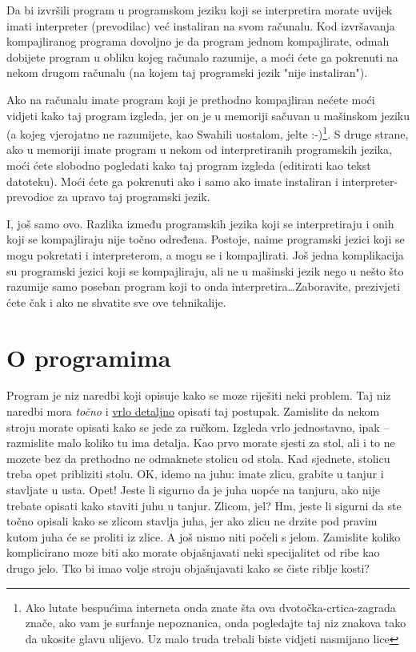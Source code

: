 	Da bi izvršili program u programskom jeziku koji se interpretira morate uvijek
	imati interpreter (prevodilac) već instaliran na svom računalu. Kod
	izvršavanja kompajliranog programa dovoljno je da program jednom kompajlirate,
	odmah dobijete program u obliku kojeg računalo razumije, a moći ćete ga
	pokrenuti na nekom drugom računalu (na kojem taj programski jezik "nije
	instaliran"). 

	Ako na računalu imate program koji je prethodno kompajliran nećete moći
	vidjeti kako taj program izgleda, jer on je u memoriji sačuvan u mašinskom
	jeziku (a kojeg vjerojatno ne razumijete, kao Swahili uostalom, jelte 
	:-)\footnote{Ako lutate bespućima interneta onda znate šta ova
	dvotočka-crtica-zagrada znače, ako vam je surfanje nepoznanica, onda
	pogledajte taj niz znakova tako da ukosite glavu ulijevo. Uz malo truda trebali
	biste vidjeti nasmijano lice}. 
	S druge
	strane, ako u memoriji imate program u nekom od interpretiranih programskih jezika,
	moći ćete slobodno pogledati kako taj program izgleda (editirati kao tekst
	datoteku). Moći ćete ga pokrenuti ako i samo ako imate instaliran i
	interpreter-prevodioc za upravo taj programski jezik.

	I, još samo ovo. Razlika između programskih jezika koji se interpretiraju
	i onih koji se kompajliraju nije točno određena. Postoje, naime programski
	jezici koji se mogu pokretati i interpreterom, a mogu se i kompajlirati. Još
	jedna komplikacija su programski jezici koji se kompajliraju, ali ne u mašinski
	jezik nego u nešto što razumije samo poseban program koji to onda
	interpretira\dots Zaboravite, prezivjeti ćete čak i ako ne shvatite sve
	ove tehnikalije.

\section{O programima}
	
	Program je niz naredbi koji opisuje kako se moze riješiti neki problem. Taj
	niz naredbi mora \emph{točno} i \underline{vrlo detaljno} opisati taj
	postupak. Zamislite da nekom stroju morate opisati kako se jede za ručkom.
	Izgleda vrlo jednostavno, ipak -- razmislite malo koliko tu ima detalja. Kao prvo
	morate sjesti za stol, ali i to ne mozete bez da prethodno ne odmaknete stolicu
	od stola. Kad sjednete, stolicu treba opet pribliziti stolu. OK, idemo na juhu:
	imate zlicu, grabite u tanjur i stavljate u usta. Opet! Jeste li sigurno da je
	juha uopće na tanjuru, ako nije trebate opisati kako staviti juhu u tanjur.
	Zlicom, jel? Hm, jeste li sigurni da ste točno opisali kako se zlicom
	stavlja juha, jer ako zlicu ne drzite pod pravim kutom juha će
	se proliti iz zlice. A još nismo niti počeli s jelom. Zamislite
	koliko komplicirano moze biti ako morate objašnjavati neki specijalitet od
	ribe kao drugo jelo.
	Tko bi imao volje stroju objašnjavati kako se
	čiste riblje kosti?

